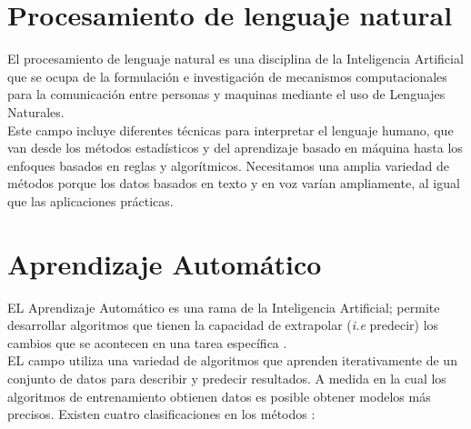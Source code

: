 
\section[Procesamiento de lenguaje N]{Procesamiento de lenguaje natural}

El procesamiento de lenguaje natural es una disciplina de la Inteligencia Artificial que se ocupa de la formulación e 
investigación de mecanismos computacionales para la comunicación entre personas y maquinas mediante el uso de Lenguajes 
Naturales.\\

Este campo incluye diferentes técnicas para interpretar el lenguaje humano, que van desde los métodos 
estadísticos y del aprendizaje basado en máquina hasta los enfoques basados en reglas y algorítmicos. Necesitamos una amplia variedad 
de métodos porque los datos basados en texto y en voz varían ampliamente, al igual que las aplicaciones prácticas. 


\section{Aprendizaje Automático}

EL Aprendizaje Automático es una rama de la Inteligencia Artificial; permite desarrollar algoritmos que tienen la capacidad de extrapolar (\textit{i.e} predecir) los cambios que se acontecen en una tarea específica \citep{CT2}.\\

EL campo utiliza una variedad de algoritmos que aprenden iterativamente de un conjunto de
datos para describir y predecir resultados. A medida en la cual los algoritmos de 
entrenamiento obtienen datos es posible obtener modelos más precisos. Existen cuatro clasificaciones en los métodos \citep{CT21}:

